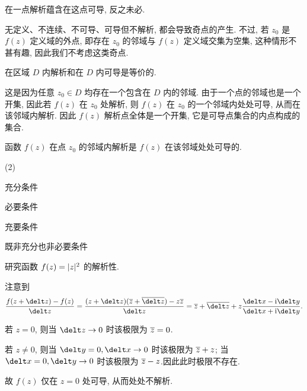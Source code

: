 
\begin{marker}
  在一点解析蕴含在这点可导, 反之未必.
\end{marker}

无定义、不连续、不可导、可导但不解析, 都会导致奇点的产生.
不过, 若 $z_0$ 是 $f(z)$ 定义域的外点, 即存在 $z_0$ 的邻域与 $f(z)$ 定义域交集为空集, 这种情形不甚有趣, 因此我们不考虑这类奇点.

\begin{marker}
  在区域 $D$ 内解析和在 $D$ 内可导是等价的.
\end{marker}

这是因为任意 $z_0\in D$ 均存在一个包含在 $D$ 内的邻域.
由于一个点的邻域也是一个开集, 因此若 $f(z)$ 在 $z_0$ 处解析, 则 $f(z)$ 在 $z_0$ 的一个邻域内处处可导, 从而在该邻域内解析. 因此 \alert{$f(z)$ 解析点全体是一个开集}, 它是可导点集合的内点构成的集合.

\begin{exercise}
  函数 $f(z)$ 在点 $z_0$ 的邻域内解析是 $f(z)$ 在该邻域处处可导的\fillbrace{}.
  \begin{examplechoice}(2)
    \item 充分条件
    \item 必要条件
    \item 充要条件
    \item 既非充分也非必要条件
  \end{examplechoice}
\end{exercise}

\begin{example}
  研究函数 $f(z)=\lvert z\rvert^2$ 的解析性.
\end{example}

\begin{solution}
  注意到
  \[
     \frac{f(z+\delt z)-f(z)}{\delt z}
    =\frac{(z+\delt z)(\ov z+\ov{\delt z})-z\ov z}{\delt z}
    =\ov z+\ov{\delt z}
      +z\frac{\delt x-\ii\delt y}{\delt x+\ii\delt y}.
  \]
  \vspace{-\baselineskip}
  \begin{enumr}
    \item 若 $z=0$, 则当 $\delt z\ra 0$ 时该极限为 $\overline z=0$.
    \item 若 $z\neq0$, 则当 $\delt y=0,\delt x\ra 0$ 时该极限为 $\overline z+z$; 当 $\delt x=0,\delt y\ra 0$ 时该极限为 $\overline z-z$.因此此时极限不存在.
  \end{enumr}
  故 $f(z)$ 仅在 $z=0$ 处可导, 从而处处不解析.
\end{solution}

